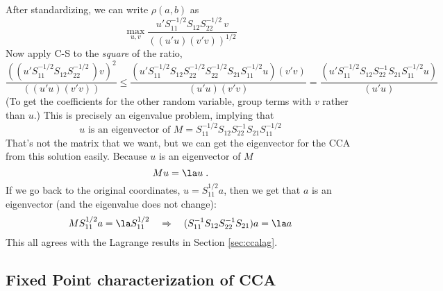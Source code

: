 \documentclass[12pt]{article}
\begin{document}
 After standardizing, we can write $\rho(a,b)$ as
 \begin{displaymath}
    \max_{u,v} \frac{u'S_{11}^{-1/2} S_{12} S_{22}^{-1/2}\,v}
                    {\left((u'u)(v'v)\right)^{1/2}}      
 \end{displaymath}
Now apply C-S to the {\em square} of the ratio,
 \begin{displaymath}
   \frac{((u'S_{11}^{-1/2} S_{12} S_{22}^{-1/2}\,)v)^2}
                    {\left((u'u)(v'v)\right)}
   \le 
   \frac{
    (u'S_{11}^{-1/2}S_{12}S_{22}^{-1/2}S_{22}^{-1/2}S_{21}S_{11}^{-1/2}u)
    (v'v)}
     {(u'u) (v'v) }
   = 
   \frac{
    (u'S_{11}^{-1/2}S_{12}S_{22}^{-1}S_{21}S_{11}^{-1/2}u)}
     {(u'u)}
 \end{displaymath}
 (To get the coefficients for the other random variable, group terms with $v$ rather than $u$.) This is precisely an eigenvalue problem, implying that 
 \begin{displaymath}
    u\mbox{ is an eigenvector of }
        M = S_{11}^{-1/2}S_{12}S_{22}^{-1}S_{21}S_{11}^{-1/2}
 \end{displaymath}
 That's not the matrix that we want, but we can get the eigenvector for the CCA
 from this solution easily. Because $u$ is an eigenvector of $M$
 \begin{displaymath}
     M u = \la u \;.
 \end{displaymath}
 If we go back to the original coordinates, $u = S_{11}^{1/2}a$, then we get
 that $a$ is an eigenvector (and the eigenvalue does not change):
 \begin{displaymath}
    M S_{11}^{1/2} a = \la S_{11}^{1/2}  \quad \Rightarrow \quad
    (S_{11}^{-1}S_{12}S_{22}^{-1}S_{21}) a = \la a
 \end{displaymath}
 This all agrees with the Lagrange results in Section \ref{sec:ccalag}.


\subsection{Fixed Point characterization of CCA}
\end{document}
